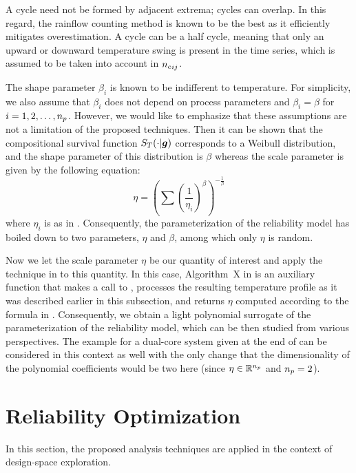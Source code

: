 \begin{remark}
A cycle need not be formed by adjacent extrema; cycles can overlap. In this
regard, the rainflow counting method is known to be the best as it efficiently
mitigates overestimation. A cycle can be a half cycle, meaning that only an
upward or downward temperature swing is present in the time series, which is
assumed to be taken into account in ${n_{c}}_{ij}$.
\end{remark}

The shape parameter $\beta_i$ is known to be indifferent to temperature. For
simplicity, we also assume that $\beta_i$ does not depend on process parameters
and $\beta_i = \beta$ for $i = 1, 2, \dotsc, {n_{p}}$. However, we would like to
emphasize that these assumptions are not a limitation of the proposed
techniques. Then it can be shown that the compositional survival function
$S_T(\cdot | \boldsymbol{g})$ corresponds to a Weibull distribution, and the shape
parameter of this distribution is $\beta$ whereas the scale parameter is given
by the following equation:
\[
  \eta = \left(\sum\left(\frac{1}{\eta_i}\right)^\beta\right)^{-\frac{1}{\beta}}
\]
where $\eta_i$ is as in . Consequently, the parameterization
of the reliability model has boiled down to two parameters, $\eta$ and $\beta$,
among which only $\eta$ is random.

Now we let the scale parameter $\eta$ be our quantity of interest \g and apply
the technique in  to this quantity. In this case,
Algorithm~X in  is an auxiliary function that makes
a call to , processes the resulting temperature
profile as it was described earlier in this subsection, and returns $\eta$
computed according to the formula in . Consequently,
we obtain a light polynomial surrogate of the parameterization of the
reliability model, which can be then studied from various perspectives. The
example for a dual-core system given at the end of 
can be considered in this context as well with the only change that the
dimensionality of the polynomial coefficients would be two here (since $\eta \in
\mathbb{R}^{n_{p}}$ and ${n_{p}} = 2$).

\section{Reliability Optimization}

In this section, the proposed analysis techniques are applied in the context of
design-space exploration.

